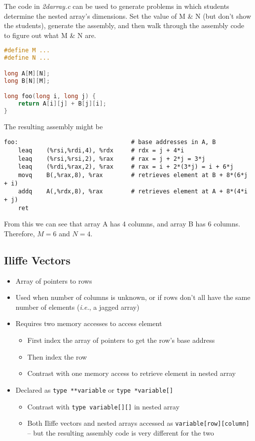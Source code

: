 \documentclass{article}
\begin{document}
The code in \textit{2darray.c} can be used to generate problems in which students determine the nested array's dimensions.
Set the value of M \& N (but don't show the students), generate the assembly, and then walk through the assembly code to figure out what M \& N are.

\begin{lstlisting}[language=C]
#define M ...
#define N ...

long A[M][N];
long B[N][M];

long foo(long i, long j) {
    return A[i][j] + B[j][i];
}
\end{lstlisting}

The resulting assembly might be
\begin{lstlisting}[language={[x86masm]Assembler}]
foo:                                # base addresses in A, B
    leaq    (%rsi,%rdi,4), %rdx     # rdx = j + 4*i
    leaq    (%rsi,%rsi,2), %rax     # rax = j + 2*j = 3*j
    leaq    (%rdi,%rax,2), %rax     # rax = i + 2*(3*j) = i + 6*j
    movq    B(,%rax,8), %rax        # retrieves element at B + 8*(6*j + i)
    addq    A(,%rdx,8), %rax        # retrieves element at A + 8*(4*i + j)
    ret
\end{lstlisting}
From this we can see that array A has 4 columns, and array B has 6 columns.
Therefore, $M=6$ and $N=4$.

\subsection{Iliffe Vectors}

\begin{itemize}
\item Array of pointers to rows
\item Used when number of columns is unknown, or if rows don't all have the same number of elements (\textit{i.e.}, a jagged array)
\item Requires two memory accesses to access element
    \begin{itemize}
    \item First index the array of pointers to get the row's base address
    \item Then index the row
    \item Contrast with one memory access to retrieve element in nested array
    \end{itemize}
\item Declared as \lstinline{type **variable} or \lstinline{type *variable[]}
    \begin{itemize}
    \item Contrast with \lstinline{type variable[][]} in nested array
    \item Both Iliffe vectors and nested arrays accessed as \lstinline{variable[row][column]} -- but the resulting assembly code is very different for the two
    \end{itemize}
\end{itemize}
\end{document}
